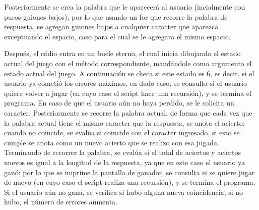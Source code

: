 \documentclass[letter,12pt]{article} %
\begin{document}
Posteriormente se crea la palabra que le aparecerá al usuario (incialmente con puros guiones bajos), por lo que usando un for que recorre la palabra de respuesta, se agregan guiones bajos a cualquier caracter que aparezca exceptuando el espacio, caso para el cual se le agregara el mismo espacio.\\
\vspace{\baselineskip}

Después, el códio entra en un bucle eterno, el cual inicia dibujando el estado actual del juego con el método correspondiente, mandándole como argumento el estado actual del juego. A continuación se checa si este estado es 6, es decir, si el usuario ya cometió los errores máximos, en dado caso, se consulta si el usuario quiere volver a jugar (en cuyo caso el script hace una recursión), y se termina el programa. En caso de que el usuario aún no haya perdido, se le solicita un caracter. Posteriormente se recorre la palabra actual, de forma que cada vez que la palabra actual tiene el mismo caracter que la respuesta, se anota el acierto; cuando no coincide, se evalúa si coincide con el caracter ingresado, si esto se cumple se anota como un nuevo acierto que se realizo con esa jugada. Terminando de recorrer la palabra, se evalúa si el total de aciertos y aciertos nuevos es igual a la longitud de la respuesta, ya que en este caso el usuario ya ganó; por lo que se imprime la pantalla de ganador, se consulta si se quiere jugar de nuevo (en cuyo caso el script realiza una recursión), y se termina el programa. Si el usuario aún no gana, se verifica si hubo alguna nueva coincidencia, si no hubo, el número de errores aumenta.\\
\end{document}
